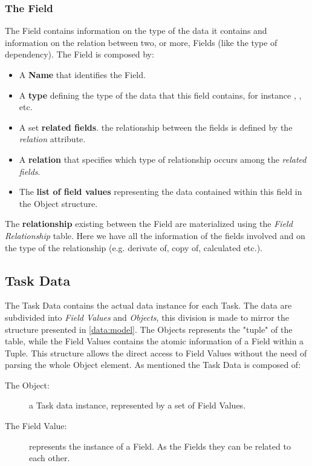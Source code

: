 \subsubsection{The Field}
The Field contains information on the type of the data it contains and information
on the relation between two, or more, Fields (like the type of dependency).
The Field is composed by:
\begin{itemize}
    \item A \textbf{Name} that identifies the Field.
    
    \item A \textbf{type} defining the type of the data that this field contains,
    for instance , , etc.

    \item A set \textbf{related fields}. the relationship between the fields
    is defined by the \emph{relation} attribute.
    
    \item A \textbf{relation} that specifies which type of relationship occurs
    among the \emph{related fields}.

    \item The \textbf{list of field values} representing the data contained within
    this field in the Object structure.
\end{itemize}

The \textbf{relationship} existing between the Field are materialized using the
\emph{Field Relationship} table. Here we have all the information of the fields
involved and on the type of the relationship (e.g. derivate of, copy of, calculated
etc.).








\subsection{Task Data}
The Task Data contains the actual data instance for each Task. The data
are subdivided into \emph{Field Values} and \emph{Objects}, this division is made
to mirror the structure presented in \ref{data:model}. The Objects represents
the "tuple" of the table, while the Field Values contains the atomic information
of a Field within a Tuple. This structure allows the direct access to Field
Values without the need of parsing the whole Object element. As mentioned the
Task Data is composed of:
\begin{description}
    \item[The Object:] a Task data instance, represented by a set of Field Values.
    \item[The Field Value:] represents the instance of a Field. As the Fields
    they can be related to each other.
\end{description}


